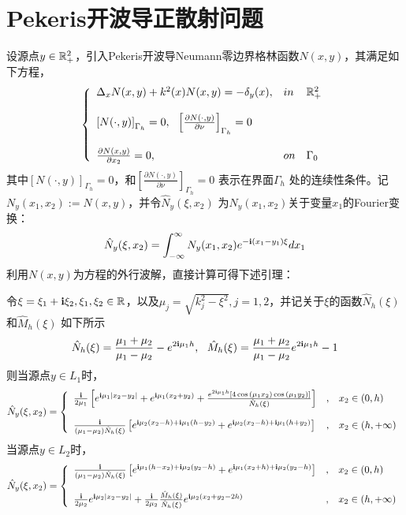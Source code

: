 \section{Pekeris开波导正散射问题}
设源点$y\in\mathbb{R}^2_+$，引入Pekeris开波导Neumann零边界格林函数$N(x,y)$，其满足如下方程，
\begin{eqnarray}\label{G_Neumann}
\left\{
\begin{array}{lll}
  \Delta_xN(x,y)+k^2(x)N(x,y)=-\delta_y(x),&in&\mathbb{R}^2_+\\
  & &\\
  \left[N(\cdot,y)\right]_{\Gamma_h}=0,\ \ \left[\frac{\partial N(\cdot,y)}{\partial\nu}\right]_{\Gamma_h}=0 & &\\
  & &\\
  \frac{\partial N(x,y)}{\partial x_2}=0, &on&\Gamma_0
\end{array}
\right.
\end{eqnarray}
其中$\left[N(\cdot,y)\right]_{\Gamma_h}=0$，和$\left[\frac{\partial N(\cdot,y)}{\partial\nu}\right]_{\Gamma_h}=0$ 表示在界面$\Gamma_h$ 处的连续性条件。记$N_y(x_1,x_2):=N(x,y)$，并令$\hat{N}_y(\xi,x_2)$ 为$N_y(x_1,x_2)$关于变量$x_1$的Fourier变换：
\begin{equation}
\hat{N}_y(\xi,x_2)=\int^{\infty}_{-\infty}N_y(x_1,x_2)e^{-\mathbf{i}(x_1-y_1)\xi}dx_1
\end{equation}
利用$N(x,y)$为方程的外行波解，直接计算可得下述引理：
\begin{lemma}\label{FT_Neumann}
令$\xi=\xi_1+\mathbf{i}\xi_2,\xi_1,\xi_2\in\mathbb{R}$，以及$\mu_j=\sqrt{k_j^2-\xi^2},j=1,2$，并记关于$\xi$的函数$\hat N_h(\xi)$ 和$\hat M_h(\xi)$ 如下所示
\begin{eqnarray}\label{NhMh_N}
 \hat N_h(\xi)=\frac{\mu_1+\mu_2}{\mu_1-\mu_2}-e^{2\mathbf{i}\mu_1h},\ \
 \hat M_h(\xi)=\frac{\mu_1+\mu_2}{\mu_1-\mu_2}e^{2\mathbf{i}\mu_1h}-1
\end{eqnarray}
则当源点$y\in L_1$时，
\begin{eqnarray*}
\hat{N}_y(\xi,x_2)=\left\{
\begin{array}{lll}
\frac{\mathbf{i}}{2\mu_1}\left[e^{\mathbf{i}\mu_1|x_2-y_2|}+e^{\mathbf{i}\mu_1(x_2+y_2)}+
\frac{e^{2\mathbf{i}\mu_1h}\left[4\cos{(\mu_1x_2)\cos{(\mu_1y_2)}}\right]}{\hat N_h(\xi)}\right]&,&x_2\in(0,h)\\
& &\\
\frac{\mathbf{i}}{(\mu_1-\mu_2)\hat N_h(\xi)}\left[e^{\mathbf{i}\mu_2(x_2-h)+\mathbf{i}\mu_1(h-y_2)}
  +e^{\mathbf{i}\mu_2(x_2-h)+\mathbf{i}\mu_1(h+y_2)}\right]&,&x_2\in(h,+\infty)
\end{array}
\right.
\end{eqnarray*}
当源点$y\in L_2$时，
\begin{eqnarray*}
\hat{N}_y(\xi,x_2)=\left\{
\begin{array}{lll}
\frac{\mathbf{i}}{(\mu_1-\mu_2)\hat N_h(\xi)}\left[e^{\mathbf{i}\mu_1(h-x_2)+\mathbf{i}\mu_2(y_2-h)}+e^{\mathbf{i}\mu_1(x_2+h)+\mathbf{i}\mu_2(y_2-h)}\right]&,& x_2\in(0,h)\\
& &\\
\frac{\mathbf{i}}{2\mu_2}e^{\mathbf{i}\mu_2|x_2-y_2|}+\frac{\mathbf{i}}{2\mu_2}\frac{\hat M_h(\xi)}{\hat N_h(\xi)}e^{\mathbf{i}\mu_2(x_2+y_2-2h)}&,&  x_2\in(h,+\infty)
\end{array}
\right.
\end{eqnarray*}
\end{lemma}
